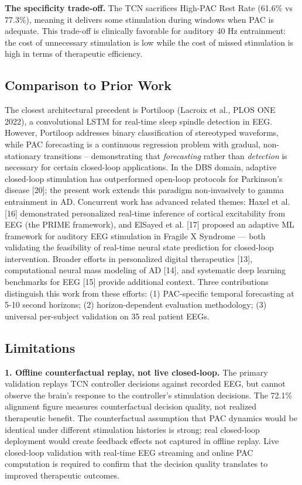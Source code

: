 \documentclass[11pt,letterpaper]{article}
\begin{document}
\textbf{The specificity trade-off.} The TCN sacrifices High-PAC Rest Rate (61.6\% vs 77.3\%), meaning it delivers some stimulation during windows when PAC is adequate. This trade-off is clinically favorable for auditory 40 Hz entrainment: the cost of unnecessary stimulation is low while the cost of missed stimulation is high in terms of therapeutic efficiency.

\subsection{Comparison to Prior Work}

The closest architectural precedent is Portiloop (Lacroix et al., PLOS ONE 2022), a convolutional LSTM for real-time sleep spindle detection in EEG. However, Portiloop addresses binary classification of stereotyped waveforms, while PAC forecasting is a continuous regression problem with gradual, non-stationary transitions -- demonstrating that \textit{forecasting} rather than \textit{detection} is necessary for certain closed-loop applications. In the DBS domain, adaptive closed-loop stimulation has outperformed open-loop protocols for Parkinson's disease [20]; the present work extends this paradigm non-invasively to gamma entrainment in AD. Concurrent work has advanced related themes: Haxel et al. [16] demonstrated personalized real-time inference of cortical excitability from EEG (the PRIME framework), and ElSayed et al. [17] proposed an adaptive ML framework for auditory EEG stimulation in Fragile X Syndrome --- both validating the feasibility of real-time neural state prediction for closed-loop intervention. Broader efforts in personalized digital therapeutics [13], computational neural mass modeling of AD [14], and systematic deep learning benchmarks for EEG [15] provide additional context. Three contributions distinguish this work from these efforts: (1) PAC-specific temporal forecasting at 5-10 second horizons; (2) horizon-dependent evaluation methodology; (3) universal per-subject validation on 35 real patient EEGs.

\subsection{Limitations}

\textbf{1. Offline counterfactual replay, not live closed-loop.} The primary validation replays TCN controller decisions against recorded EEG, but cannot observe the brain's response to the controller's stimulation decisions. The 72.1\% alignment figure measures counterfactual decision quality, not realized therapeutic benefit. The counterfactual assumption that PAC dynamics would be identical under different stimulation histories is strong; real closed-loop deployment would create feedback effects not captured in offline replay. Live closed-loop validation with real-time EEG streaming and online PAC computation is required to confirm that the decision quality translates to improved therapeutic outcomes.
\end{document}
